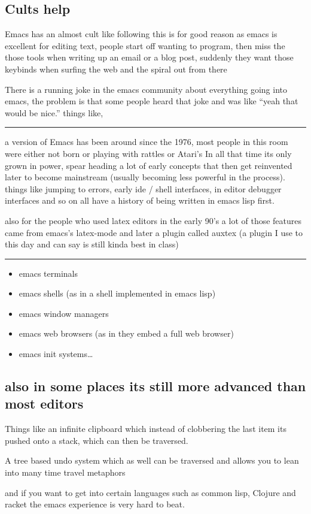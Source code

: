\documentclass[a4paper]{article}
\begin{document}
\subsection*{Cults help}
\label{sec:orgfa26293}
\begin{notes}
Emacs has an almost cult like following this is for good reason as emacs is
excellent for editing text, people start off wanting to program, then miss the
those tools when writing up an email or a blog post, suddenly they want those
keybinds when surfing the web and the spiral out from there

There is a running joke in the emacs community about everything going into
emacs, the problem is that some people heard that joke and was like ``yeah that
would be nice.''
things like,

\noindent\rule{\textwidth}{0.5pt}
a version of Emacs has been around since the 1976, most people in this room were either not
born or playing with rattles or Atari's
In all that time its only grown in power, spear heading a lot of early concepts
that then get reinvented later to become mainstream (usually becoming less
powerful in the process). things like jumping to errors, early ide / shell
interfaces, in editor debugger interfaces and so on all have a history of being
written in emacs lisp first.

also for the people who used latex editors in the early 90's a lot of those
features came from emacs's latex-mode and later a plugin called auxtex (a plugin
I use to this day and can say is still kinda best in class)

\noindent\rule{\textwidth}{0.5pt}
\end{notes}
\begin{itemize}
\item emacs terminals
\item emacs shells (as in a shell implemented in emacs lisp)
\item emacs window managers
\item emacs web browsers (as in they embed a full web browser)
\item emacs init systems\ldots{}
\end{itemize}

\subsection*{also in some places its still more advanced than most editors}
\label{sec:orgc90fab8}
\begin{notes}
Things like an infinite clipboard which instead of clobbering the last item its
pushed onto a stack, which can then be traversed.

A tree based undo system which as well can be traversed and allows you to lean
into many time travel metaphors

and if you want to get into certain languages such as common lisp,
Clojure and racket the emacs experience is very hard to beat.
\end{notes}
\end{document}
